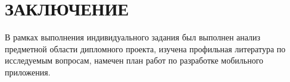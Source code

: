 \section*{ЗАКЛЮЧЕНИЕ}

В рамках выполнения индивидуального задания был выполнен анализ
предметной области дипломного проекта, изучена профильная литература по
исследуемым вопросам, намечен план работ по разработке мобильного приложения.
